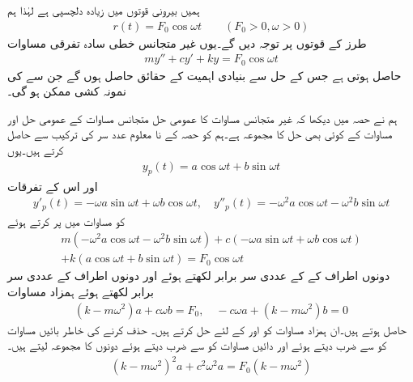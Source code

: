 ہمیں  بیرونی قوتوں میں زیادہ دلچسپی ہے لہٰذا ہم
\begin{align*}
r(t)=F_0\cos \omega t\quad\quad (F_0 >0, \omega>0)
\end{align*}
طرز کے قوتوں پر توجہ دیں گے۔یوں غیر متجانس خطی سادہ تفرقی مساوات 
 \begin{align}\label{مساوات_سادہ_دو_غیر_متجانس_نظام_پ}
my''+cy'+ky=F_0 \cos \omega t
\end{align} 
حاصل ہوتی ہے جس کے حل سے بنیادی اہمیت کے حقائق حاصل ہوں گے  جن سے  کی نمونہ کشی ممکن ہو گی۔

ہم نے حصہ  میں دیکھا کہ غیر متجانس مساوات  کا عمومی حل  متجانس مساوات  کے عمومی حل  اور مساوات  کے کوئی بھی حل  کا مجموعہ ہے۔ہم  کو حصہ  کے نا معلوم عدد سر کی ترکیب سے حاصل کرتے ہیں۔یوں
\begin{align}\label{مساوات_سادہ_دو_جبری_تفاعل_حل}
y_p(t)=a \cos \omega t +b \sin \omega t
\end{align}
اور اس کے تفرقات
\begin{align*}
y'_p(t)=-\omega a \sin \omega t+\omega b \cos \omega t, \quad y''_p(t)=-\omega^2a\cos \omega t-\omega^2 b\sin \omega t
\end{align*}
کو مساوات  میں پر کرتے ہوئے
 \begin{multline*}
m(-\omega^2a\cos \omega t-\omega^2 b\sin \omega t)+c(-\omega a \sin \omega t+\omega b \cos \omega t)\\
+k(a \cos \omega t+b \sin \omega t)=F_0 \cos \omega t
\end{multline*} 
 دونوں اطراف کے  کے عددی سر برابر لکھتے ہوئے اور دونوں اطراف  کے عددی سر برابر لکھتے ہوئے ہمزاد مساوات
\begin{align*}
(k-m\omega^2)a+c\omega b=F_0,\quad -c\omega a+(k-m\omega^2)b=0 
\end{align*}
حاصل ہوتے ہیں۔ان ہمزاد مساوات کو  اور  کے لئے حل کرتے ہیں۔ حذف کرنے کی خاطر بائیں مساوات کو  سے ضرب دیتے ہوئے اور دائیں مساوات کو  سے ضرب دیتے ہوئے دونوں کا مجموعہ لیتے ہیں۔
\begin{align*}
(k-m\omega^2)^2a+c^2\omega^2a=F_0(k-m\omega^2)
\end{align*}
